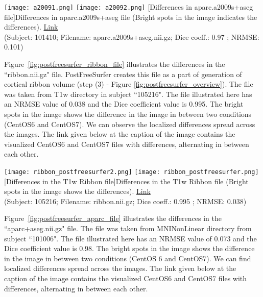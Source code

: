 \begin{center}
\texttt{[image: a20091.png]}%
\texttt{[image: a20092.png]}
  [Differences in aparc.a2009s+aseg file]{Differences in aparc.a2009s+aseg file (Bright spots in the image indicates the differences). \href{https://drive.google.com/file/d/1eeofWaPyk-A2pQd6LlieQwbMYVOrfeI3/view?usp=sharing}{Link}\\(Subject: 101410; Filename: aparc.a2009s+aseg.nii.gz; Dice coeff.: 0.97 ; NRMSE: 0.101)}
\label{fig:postfreesurfer_high_nrmse}
\end{center}

Figure~\ref{fig:postfreesurfer_ribbon_file} illustrates the differences in the ``ribbon.nii.gz" file. PostFreeSurfer creates this file as a part of generation of cortical ribbon volume (step (3) - Figure \ref{fig:postfreesurfer_overview}). The file was taken from T1w directory in subject ``105216". The file illustrated here has an NRMSE value of 0.038 and the Dice coefficient value is 0.995. The bright spots in the image shows the difference in the image in between two conditions (CentOS6 and CentOS7). We can observe the localized differences spread across the images. The link given below at the caption of the image contains the visualized CentOS6 and CentOS7 files with differences, alternating in between each other.

\begin{center}
\texttt{[image: ribbon\_postfreesurfer2.png]}%
\texttt{[image: ribbon\_postfreesurfer.png]}
  [Differences in the T1w Ribbon file]{Differences in the T1w Ribbon file (Bright spots in the image shows the differences). \href{https://drive.google.com/file/d/1KGEvLP4bltu5k6m9tttoTuhehaH3ldGk/view?usp=sharing}{Link}\\(Subject: 105216; Filename: ribbon.nii.gz; Dice coeff.: 0.995 ; NRMSE: 0.038)}
\label{fig:postfreesurfer_ribbon_file}
\end{center}

Figure~\ref{fig:postfreesurfer_aparc_file} illustrates the differences in the ``aparc+aseg.nii.gz" file. The file was taken from MNINonLinear directory from subject ``101006". The file illustrated here has an NRMSE value of 0.073 and the Dice coefficient value is 0.98. The bright spots in the image shows the difference in the image in between two conditions (CentOS 6 and CentOS7). We can find localized differences spread across the images. The link given below at the caption of the image contains the visualized CentOS6 and CentOS7 files with differences, alternating in between each other.

